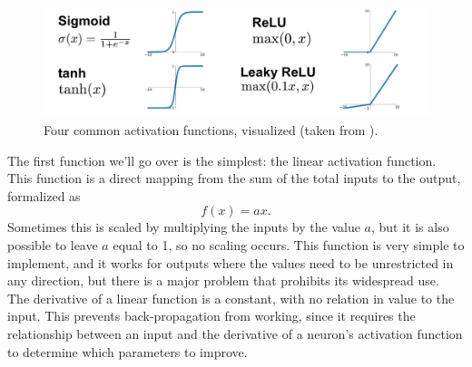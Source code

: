 \documentclass[11pt,a4paper,oldfontcommands]{memoir}
\begin{document}
\begin{figure}[h]
    \centering
    \includegraphics[width=40em]{Images/Activation_Functions.png}
    \caption{Four common activation functions, visualized (taken from \cite{activation_functions}).}
    \label{fig:activations}
\end{figure}

The first function we'll go over is the simplest: the linear activation function. This function is a direct mapping from the sum of the total inputs to the output, formalized as
\begin{equation}
    f(x) = ax.
\end{equation}
Sometimes this is scaled by multiplying the inputs by the value $a$, but it is also possible to leave $a$ equal to 1, so no scaling occurs. This function is very simple to implement, and it works for outputs where the values need to be unrestricted in any direction, but there is a major problem that prohibits its widespread use. The derivative of a linear function is a constant, with no relation in value to the input. This prevents back-propagation from working, since it requires the relationship between an input and the derivative of a neuron's activation function to determine which parameters to improve. 
\end{document}

